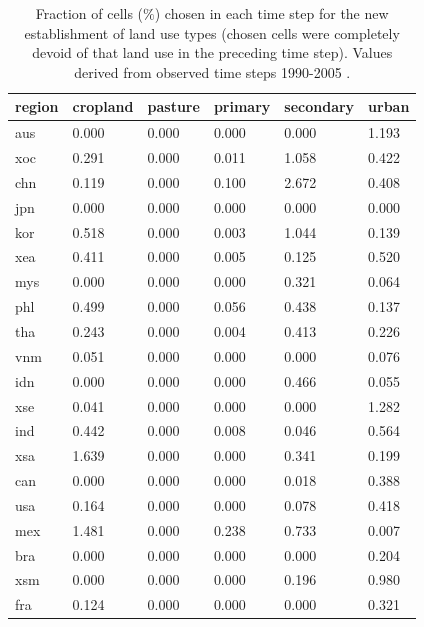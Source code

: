\documentclass[titlesmallcaps,copyrightpage]{uomthesis}\usepackage[]{graphicx}\usepackage[]{color}
\begin{document}
\begin{table}[htb]
\centering
\caption{Fraction of cells ($\%$) chosen in each time step for the new establishment of land use types (chosen cells were completely devoid of that land use in the preceding time step). Values derived from observed time steps 1990-2005 \citep{hurtt_harmonization_2011}.}
\label{apx:ch4:tab_newest}
\begin{tabularx}{0.55\textwidth}{lllllY}
\toprule
region & cropland & pasture & primary & secondary & urban \\
\bottomrule
aus    & 0.000    & 0.000   & 0.000   & 0.000     & 1.193 \\
xoc    & 0.291    & 0.000   & 0.011   & 1.058     & 0.422 \\
chn    & 0.119    & 0.000   & 0.100   & 2.672     & 0.408 \\
jpn    & 0.000    & 0.000   & 0.000   & 0.000     & 0.000 \\
kor    & 0.518    & 0.000   & 0.003   & 1.044     & 0.139 \\
xea    & 0.411    & 0.000   & 0.005   & 0.125     & 0.520 \\
mys    & 0.000    & 0.000   & 0.000   & 0.321     & 0.064 \\
phl    & 0.499    & 0.000   & 0.056   & 0.438     & 0.137 \\
tha    & 0.243    & 0.000   & 0.004   & 0.413     & 0.226 \\
vnm    & 0.051    & 0.000   & 0.000   & 0.000     & 0.076 \\
idn    & 0.000    & 0.000   & 0.000   & 0.466     & 0.055 \\
xse    & 0.041    & 0.000   & 0.000   & 0.000     & 1.282 \\
ind    & 0.442    & 0.000   & 0.008   & 0.046     & 0.564 \\
xsa    & 1.639    & 0.000   & 0.000   & 0.341     & 0.199 \\
can    & 0.000    & 0.000   & 0.000   & 0.018     & 0.388 \\
usa    & 0.164    & 0.000   & 0.000   & 0.078     & 0.418 \\
mex    & 1.481    & 0.000   & 0.238   & 0.733     & 0.007 \\
bra    & 0.000    & 0.000   & 0.000   & 0.000     & 0.204 \\
xsm    & 0.000    & 0.000   & 0.000   & 0.196     & 0.980 \\
fra    & 0.124    & 0.000   & 0.000   & 0.000     & 0.321 \\

\end{tabularx}
\end{table}
\end{document}
